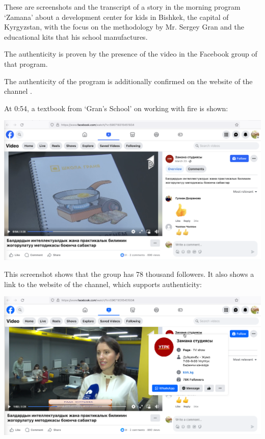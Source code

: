 
These are screenshots and the transcript of a story in the morning program `Zamana'
about a development center for kids in Bishkek, the capital of Kyrgyzstan,
with the focus on the methodology by Mr. Sergey Gran and the educational kits
that his school manufactures.

The authenticity is proven by the presence of the video in the Facebook group of that program.

The authenticity of the program is additionally confirmed on the website of the channel .

At 0:54, a textbook from `Gran's School' on working with fire is shown:

\includegraphics[width=\textwidth]{0_54_book-fire}



This screenshot shows that the group has 78 thousand followers.
It also shows a link to the website of the channel, which supports authenticity:

\includegraphics[width=\textwidth]{1_02_rada-stats}

